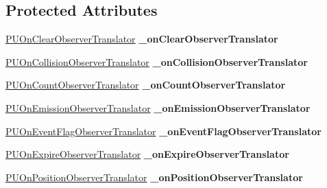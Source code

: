 \subsection*{Protected Attributes}
\begin{DoxyCompactItemize}
\item 
\mbox{\label{classPUObserverManager_a7a1a6388200a25c7db88fe95ecad321b}} 
\hyperlink{classPUOnClearObserverTranslator}{P\+U\+On\+Clear\+Observer\+Translator} {\bfseries \+\_\+on\+Clear\+Observer\+Translator}
\item 
\mbox{\label{classPUObserverManager_a5bd778068bb3ef2b3233985dbf4e6a8e}} 
\hyperlink{classPUOnCollisionObserverTranslator}{P\+U\+On\+Collision\+Observer\+Translator} {\bfseries \+\_\+on\+Collision\+Observer\+Translator}
\item 
\mbox{\label{classPUObserverManager_a48172066e2dad6f5ce0cf1c3c4728674}} 
\hyperlink{classPUOnCountObserverTranslator}{P\+U\+On\+Count\+Observer\+Translator} {\bfseries \+\_\+on\+Count\+Observer\+Translator}
\item 
\mbox{\label{classPUObserverManager_a7f615519c39f33de6ed1a01f10d1abe4}} 
\hyperlink{classPUOnEmissionObserverTranslator}{P\+U\+On\+Emission\+Observer\+Translator} {\bfseries \+\_\+on\+Emission\+Observer\+Translator}
\item 
\mbox{\label{classPUObserverManager_aee3d2e0f65e5bd7327dbede8a402cc02}} 
\hyperlink{classPUOnEventFlagObserverTranslator}{P\+U\+On\+Event\+Flag\+Observer\+Translator} {\bfseries \+\_\+on\+Event\+Flag\+Observer\+Translator}
\item 
\mbox{\label{classPUObserverManager_ad10e947b206c77b171c8442302413710}} 
\hyperlink{classPUOnExpireObserverTranslator}{P\+U\+On\+Expire\+Observer\+Translator} {\bfseries \+\_\+on\+Expire\+Observer\+Translator}
\item 
\mbox{\label{classPUObserverManager_a94ae2fcceb3f68ad780dccaaaa361959}} 
\hyperlink{classPUOnPositionObserverTranslator}{P\+U\+On\+Position\+Observer\+Translator} {\bfseries \+\_\+on\+Position\+Observer\+Translator}
\item 

\end{DoxyCompactItemize}
